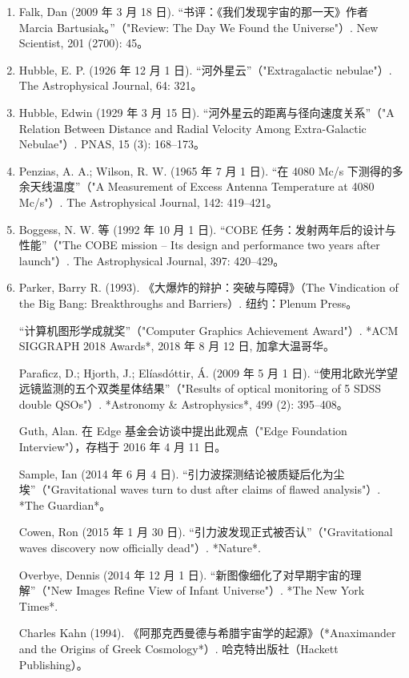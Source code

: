 \begin{enumerate}
\item Falk, Dan (2009 年 3 月 18 日). “书评：《我们发现宇宙的那一天》作者 Marcia Bartusiak。”（"Review: The Day We Found the Universe"）. New Scientist, 201 (2700): 45。  
\item Hubble, E. P. (1926 年 12 月 1 日). “河外星云”（"Extragalactic nebulae"）. The Astrophysical Journal, 64: 321。  
\item Hubble, Edwin (1929 年 3 月 15 日). “河外星云的距离与径向速度关系”（"A Relation Between Distance and Radial Velocity Among Extra-Galactic Nebulae"）. PNAS, 15 (3): 168–173。  
\item Penzias, A. A.; Wilson, R. W. (1965 年 7 月 1 日). “在 4080 Mc/s 下测得的多余天线温度”（"A Measurement of Excess Antenna Temperature at 4080 Mc/s"）. The Astrophysical Journal, 142: 419–421。  
\item Boggess, N. W. 等 (1992 年 10 月 1 日). “COBE 任务：发射两年后的设计与性能”（"The COBE mission – Its design and performance two years after launch"）. The Astrophysical Journal, 397: 420–429。  

\item Parker, Barry R. (1993). 《大爆炸的辩护：突破与障碍》（The Vindication of the Big Bang: Breakthroughs and Barriers）. 纽约：Plenum Press。  

“计算机图形学成就奖”（"Computer Graphics Achievement Award"）. *ACM SIGGRAPH 2018 Awards*, 2018 年 8 月 12 日, 加拿大温哥华。  

Paraficz, D.; Hjorth, J.; Elíasdóttir, Á. (2009 年 5 月 1 日). “使用北欧光学望远镜监测的五个双类星体结果”（"Results of optical monitoring of 5 SDSS double QSOs"）. *Astronomy & Astrophysics*, 499 (2): 395–408。  

Guth, Alan. 在 Edge 基金会访谈中提出此观点（"Edge Foundation Interview"），存档于 2016 年 4 月 11 日。  

Sample, Ian (2014 年 6 月 4 日). “引力波探测结论被质疑后化为尘埃”（"Gravitational waves turn to dust after claims of flawed analysis"）. *The Guardian*。  

Cowen, Ron (2015 年 1 月 30 日). “引力波发现正式被否认”（"Gravitational waves discovery now officially dead"）. *Nature*.  

Overbye, Dennis (2014 年 12 月 1 日). “新图像细化了对早期宇宙的理解”（"New Images Refine View of Infant Universe"）. *The New York Times*.  

Charles Kahn (1994). 《阿那克西曼德与希腊宇宙学的起源》（*Anaximander and the Origins of Greek Cosmology*）. 哈克特出版社（Hackett Publishing）。  


\end{enumerate}
